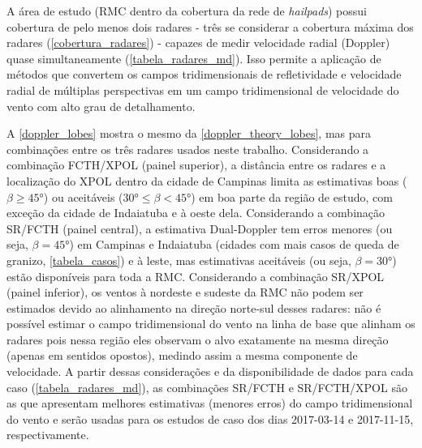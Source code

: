 A área de estudo (RMC dentro da cobertura da rede de \textit{hailpads}) possui cobertura de pelo menos dois radares - três se considerar a cobertura máxima dos radares (\autoref{cobertura_radares}) - capazes de medir velocidade radial (Doppler) quase simultaneamente (\autoref{tabela_radares_md}). Isso permite a aplicação de métodos que convertem os campos tridimensionais de refletividade e velocidade radial de múltiplas perspectivas em um campo tridimensional de velocidade do vento com alto grau de detalhamento.

\begin{table}[htb]
\end{table}

A \autoref{doppler_lobes} mostra o mesmo da \autoref{doppler_theory_lobes}, mas para combinações entre os três radares usados neste trabalho. Considerando a combinação FCTH/XPOL (painel superior), a distância entre os radares e a localização do XPOL dentro da cidade de Campinas limita as estimativas boas ($\beta \ge \ang{45}$) ou aceitáveis ($\ang{30} \le \beta < \ang{45}$) em boa parte da região de estudo, com exceção da cidade de Indaiatuba e à oeste dela. Considerando a combinação SR/FCTH (painel central), a estimativa Dual-Doppler tem erros menores (ou seja, $\beta=\ang{45}$) em Campinas e Indaiatuba (cidades com mais casos de queda de granizo, \autoref{tabela_casos}) e à leste, mas estimativas aceitáveis (ou seja, $\beta=\ang{30}$) estão disponíveis para toda a RMC. Considerando a combinação SR/XPOL (painel inferior), os ventos à nordeste e sudeste da RMC não podem ser estimados devido ao alinhamento na direção norte-sul desses radares: não é possível estimar o campo tridimensional do vento na linha de base que alinham os radares pois nessa região eles observam o alvo exatamente na mesma direção (apenas em sentidos opostos), medindo assim a mesma componente de velocidade. A partir dessas considerações e da disponibilidade de dados para cada caso (\autoref{tabela_radares_md}), as combinações SR/FCTH e SR/FCTH/XPOL são as que apresentam melhores estimativas (menores erros) do campo tridimensional do vento e serão usadas para os estudos de caso dos dias 2017-03-14 e 2017-11-15, respectivamente.

